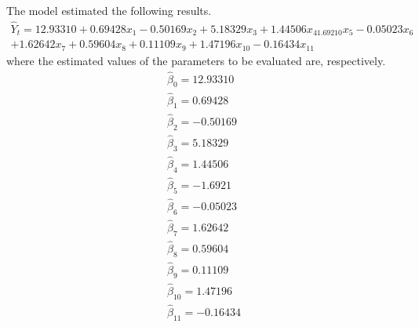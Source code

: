 \documentclass{apmcmthesis}
\begin{document}
The model estimated the following results.
\begin{equation}
\begin{aligned}
\hat{Y}_t=12.93310+0.69428x_1-0.50169x_2+5.18329x_3+1.44506x_41.69210x_5 -0.05023x_6\\
+ 1.62642x_7+ 0.59604x_8+ 0.11109x_9+ 1.47196x_{10} -0.16434x_{11} 
\end{aligned}
\end{equation}
where the estimated values of the parameters to be evaluated are, respectively. 
\begin{equation}
	\begin{aligned}
		\hat{\beta}_0 = 12.93310 \\
		\hat{\beta}_1 = 0.69428\\
		\hat{\beta}_2= -0.50169\\
		\hat{\beta}_3= 5.18329\\
		\hat{\beta}_4= 1.44506\\
		\hat{\beta}_5 = -1.6921\\
		\hat{\beta}_6 = -0.05023\\
		\hat{\beta}_7= 1.62642\\
		\hat{\beta}_8= 0.59604\\
		\hat{\beta}_9= 0.11109\\
		\hat{\beta}_{10}=1.47196\\
		\hat{\beta}_{11}= -0.16434\\
	\end{aligned}
\end{equation}
\end{document}
